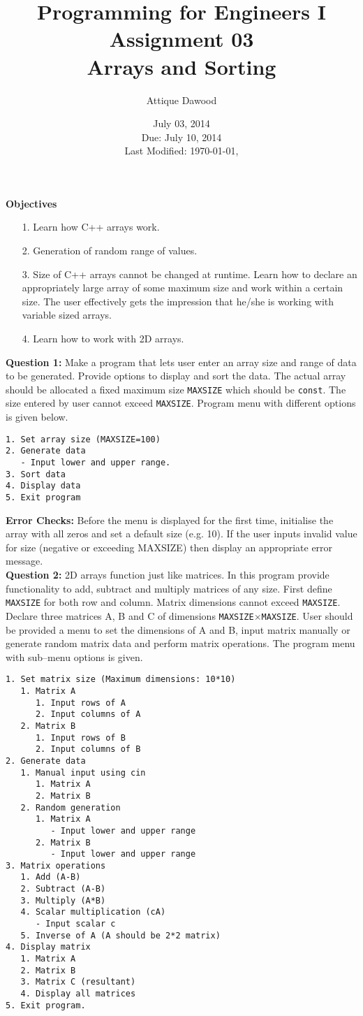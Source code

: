 \documentclass[12pt,a4paper]{article}
\title{Programming for Engineers I\\Assignment 03\\Arrays and Sorting}
\author{Attique Dawood}
\date{July 03, 2014\\Due: July 10, 2014\\[0.2cm] Last Modified: \today, \currenttime}
\begin{document}
\maketitle
\noindent\textbf{Objectives}
\begin{itemize}
\item[1.] Learn how C++ arrays work.
\item[2.] Generation of random range of values.
\item[3.] Size of C++ arrays cannot be changed at runtime. Learn how to declare an appropriately large array of some maximum size and work within a certain size. The user effectively gets the impression that he/she is working with variable sized arrays.
\item[4.] Learn how to work with 2D arrays.
\end{itemize}
\noindent\textbf{Question 1:} Make a program that lets user enter an array size and range of data to be generated. Provide options to display and sort the data. The actual array should be allocated a fixed maximum size \verb|MAXSIZE| which should be \verb|const|. The size entered by user cannot exceed \verb|MAXSIZE|. Program menu with different options is given below.
\begin{verbatim}
1. Set array size (MAXSIZE=100)
2. Generate data
   - Input lower and upper range.
3. Sort data
4. Display data
5. Exit program
\end{verbatim}
\noindent\textbf{Error Checks:} Before the menu is displayed for the first time, initialise the array with all zeros and set a default size (e.g. 10). If the user inputs invalid value for size (negative or exceeding MAXSIZE) then display an appropriate error message.\\[0.2cm]
\noindent\textbf{Question 2:} 2D arrays function just like matrices. In this program provide functionality to add, subtract and multiply matrices of any size. First define \verb|MAXSIZE| for both row and column. Matrix dimensions cannot exceed \verb|MAXSIZE|. Declare three matrices A, B and C of dimensions \verb|MAXSIZE|$\times$\verb|MAXSIZE|. User should be provided a menu to set the dimensions of A and B, input matrix manually or generate random matrix data and perform matrix operations. The program menu with sub--menu options is given.
\begin{verbatim}
1. Set matrix size (Maximum dimensions: 10*10)
   1. Matrix A
      1. Input rows of A
      2. Input columns of A
   2. Matrix B
      1. Input rows of B
      2. Input columns of B
2. Generate data
   1. Manual input using cin
      1. Matrix A
      2. Matrix B
   2. Random generation
      1. Matrix A
         - Input lower and upper range
      2. Matrix B
         - Input lower and upper range
3. Matrix operations
   1. Add (A-B)
   2. Subtract (A-B)
   3. Multiply (A*B)
   4. Scalar multiplication (cA)
      - Input scalar c
   5. Inverse of A (A should be 2*2 matrix)
4. Display matrix
   1. Matrix A
   2. Matrix B
   3. Matrix C (resultant)
   4. Display all matrices
5. Exit program.
\end{verbatim}
\end{document}

